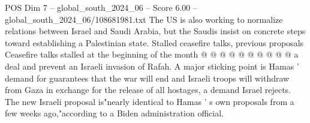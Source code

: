 \begin{textsample}{POS Dim 7 – global\_south\_2024\_06 – Score 6.00 – global\_south\_2024\_06/108681981.txt}
The US is also working to normalize relations between Israel and Saudi Arabia, but the Saudis insist on concrete steps toward establishing a Palestinian state.
Stalled ceasefire talks, previous proposals Ceasefire talks stalled at the beginning of the month @ @ @ @ @ @ @ @ @ @ a deal and prevent an Israeli invasion of Rafah.
A major sticking point is Hamas ' demand for guarantees that the war will end and Israeli troops will withdraw from Gaza in exchange for the release of all hostages, a demand Israel rejects.
The new Israeli proposal is"nearly identical to Hamas ' s own proposals from a few weeks ago,"according to a Biden administration official.

\end{textsample}
